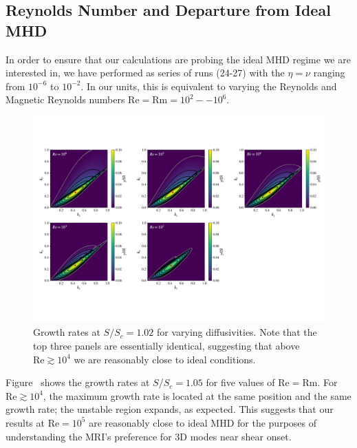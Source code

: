 \documentclass[openacc]{rsproca_new}%
\newcommand{\SSC}{S/S_{c}}
\newcommand{\Reyn}{\mathrm{Re}}
\newcommand{\Reym}{\mathrm{Rm}}
\begin{document}
\subsection{Reynolds Number and Departure from Ideal MHD}
\label{sec:reyn}

In order to ensure that our calculations are probing the ideal MHD regime we are interested in, we have performed as series of runs (24-27) with the $\eta = \nu$ ranging from $10^{-6}$ to $10^{-2}$.
In our units, this is equivalent to varying the Reynolds and Magnetic Reynolds numbers $\Reyn = \Reym = 10^2 -- 10^6$.
\begin{figure}[h!]
  \centering
  \includegraphics[width=\textwidth]{re_plots.pdf}
  \caption{Growth rates at $\SSC = 1.02$ for varying diffusivities. Note that the top three panels are essentially identical, suggesting that above $\Reyn \gtrsim 10^4$ we are reasonably close to ideal conditions.}
  \label{fig:reynolds}
\end{figure}
Figure~\pageref{fig:reynolds} shows the growth rates at $\SSC=1.05$ for five values of $\Reyn = \Reym$.
For $\Reyn \gtrsim 10^4$, the maximum growth rate is located at the same position and the same growth rate; the unstable region expands, as expected.
This suggests that our results at $\Reyn = 10^5$ are reasonably close to ideal MHD for the purposes of understanding the MRI's preference for 3D modes near shear onset.
\end{document}
